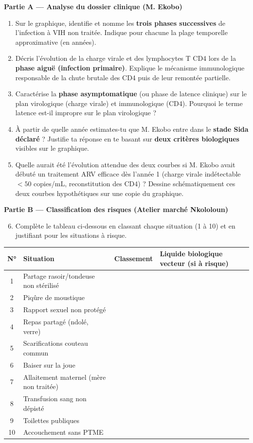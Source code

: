 \documentclass[11pt]{article}
\newcounter{popsec}
\newcounter{popsub}
\newcommand{\courssub}[1]{%
  \stepcounter{popsub}%
  \par\vspace{9pt}\noindent{\popxbold\fontsize{11.5}{13}\selectfont\color{popink}{\color{poporange}\thepopsec.\thepopsub}\hspace{6pt}#1}\par\nopagebreak\vspace{4pt}
}
\begin{document}
\courssub{Consignes}
\textbf{Partie A — Analyse du dossier clinique (M. Ekobo)}
\begin{enumerate}
    \item Sur le graphique, identifie et nomme les \textbf{trois phases successives} de l'infection à VIH non traitée. Indique pour chacune la plage temporelle approximative (en années).
    \item Décris l'évolution de la charge virale et des lymphocytes T CD4 lors de la \textbf{phase aiguë (infection primaire)}. Explique le mécanisme immunologique responsable de la chute brutale des CD4 puis de leur remontée partielle.
    \item Caractérise la \textbf{phase asymptomatique} (ou phase de latence clinique) sur le plan virologique (charge virale) et immunologique (CD4). Pourquoi le terme \og latence \fg est-il impropre sur le plan virologique ?
    \item À partir de quelle année estimates-tu que M. Ekobo entre dans le \textbf{stade Sida déclaré} ? Justifie ta réponse en te basant sur \textbf{deux critères biologiques} visibles sur le graphique.
    \item Quelle aurait été l'évolution attendue des deux courbes si M. Ekobo avait débuté un traitement ARV efficace dès l'année 1 (charge virale indétectable $< 50$ copies/mL, reconstitution des CD4) ? Dessine schématiquement ces deux courbes hypothétiques sur une copie du graphique.
\end{enumerate}

\textbf{Partie B — Classification des risques (Atelier marché Nkololoun)}
\begin{enumerate}
    \setcounter{enumi}{5}
    \item Complète le tableau ci-dessous en classant chaque situation (1 à 10) et en justifiant pour les situations à risque.
\end{enumerate}

\begin{center}
\begin{tabularx}{\linewidth}{|c|X|c|X|}
\hline
\rowcolor{popblueL}
\textbf{N°} & \textbf{Situation} & \textbf{Classement} & \textbf{Liquide biologique vecteur (si à risque)} \\
\hline
1 & Partage rasoir/tondeuse non stérilisé & & \\
\hline
2 & Piqûre de moustique & & \\
\hline
3 & Rapport sexuel non protégé & & \\
\hline
4 & Repas partagé (ndolé, verre) & & \\
\hline
5 & Scarifications couteau commun & & \\
\hline
6 & Baiser sur la joue & & \\
\hline
7 & Allaitement maternel (mère non traitée) & & \\
\hline
8 & Transfusion sang non dépisté & & \\
\hline
9 & Toilettes publiques & & \\
\hline
10 & Accouchement sans PTME & & \\
\hline
\end{tabularx}
\end{center}
\end{document}
